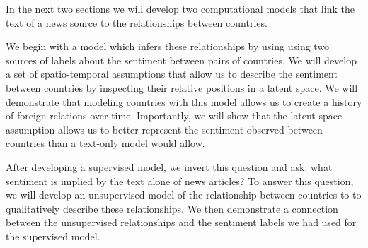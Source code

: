 In the next two sections we will develop two computational models that
link the text of a news source to the relationships between countries.

We begin with a model which infers these relationships by using using
two sources of labels about the sentiment between pairs of countries.
We will develop a set of spatio-temporal assumptions that allow us to
describe the sentiment between countries by inspecting their relative
positions in a latent space.  We will demonstrate that modeling
countries with this model allows us to create a history of foreign
relations over time.  Importantly, we will show that the latent-space
assumption allows us to better represent the sentiment observed
between countries than a text-only model would allow.

After developing a supervised model, we invert this question and ask:
what sentiment is implied by the text alone of news articles?  To
answer this question, we will develop an unsupervised model of the
relationship between countries to to qualitatively describe these
relationships.  We then demonstrate a connection between the
unsupervised relationships and the sentiment labels we had used for
the supervised model.
